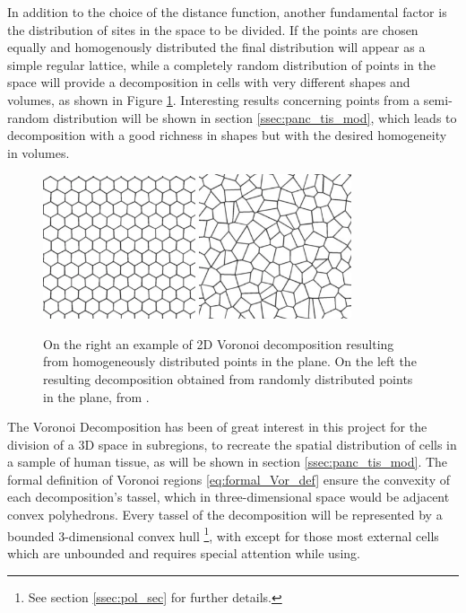 In addition to the choice of the distance function, another fundamental factor is the distribution of sites in the space to be divided. If the points are chosen equally and homogenously distributed the final distribution will appear as a simple regular lattice, while a completely random distribution of points in the space will provide a decomposition in cells with very different shapes and volumes, as shown in Figure \ref{fig:diff_pt}. Interesting results concerning points from a semi-random distribution will be shown in section \ref{ssec:panc_tis_mod}, which leads to decomposition with a good richness in shapes but with the desired homogeneity in volumes.
\begin{figure}
    \centering
    \includegraphics[width = 0.4\textwidth]{images/reg_pt}
    \includegraphics[width = 0.4\textwidth]{images/ran_pt}
    \caption{On the right an example of 2D Voronoi decomposition resulting from homogeneously distributed points in the plane. On the left the resulting decomposition obtained from randomly distributed points in the plane, from \cite{ALSAYEDNOOR201644}.}
    \label{fig:diff_pt}
\end{figure}

The Voronoi Decomposition has been of great interest in this project for the division of a 3D space in subregions, to recreate the spatial distribution of cells in a sample of human tissue, as will be shown in section \ref{ssec:panc_tis_mod}. The formal definition of Voronoi regions \ref{eq:formal_Vor_def} ensure the convexity of each decomposition's tassel, which in three-dimensional space would be adjacent convex polyhedrons. Every tassel of the decomposition will be represented by a bounded 3-dimensional convex hull \footnote{See section \ref{ssec:pol_sec} for further details.}, with except for those most external cells which are unbounded and requires special attention while using.

